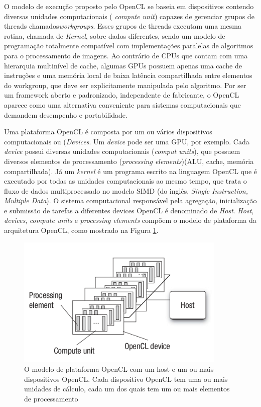 O modelo de execução proposto pelo OpenCL se baseia em dispositivos contendo diversas unidades computacionais ( \textit{compute unit}) capazes de gerenciar grupos de threads chamados\textit{workgroups}. Esses grupos de threads executam uma mesma rotina, chamada de \textit{Kernel}, sobre dados diferentes, sendo um modelo de programação totalmente compatível com implementações paralelas de algoritmos para o processamento de imagens. Ao contrário de CPUs que contam com uma hierarquia multinível de cache, algumas GPUs possuem apenas uma cache de instruções e uma memória local de baixa latência compartilhada entre elementos do workgroup, que deve ser explicitamente manipulada pelo algoritmo. Por ser um framework aberto e padronizado, independente de fabricante, o OpenCL aparece como uma alternativa conveniente para sistemas computacionais que demandem desempenho e portabilidade. 

Uma plataforma OpenCL é composta por um ou vários dispositivos computacionais ou (\textit{Devices}. Um \textit{device} pode ser uma GPU, por exemplo. Cada \textit{device} possui diversas unidades computacionais (\textit{comput units}), que possuem diversos elementos de processamento (\textit{processing elements})(ALU, cache, memória compartilhada). Já um \textit{kernel} é um programa escrito na linguagem OpenCL que é executado por todas as unidades computacionais ao mesmo tempo, que trata o fluxo de dados multiprocessado no modelo SIMD (do inglês, \textit{Single Instruction, Multiple Data}). O sistema computacional responsável pela agregação, inicialização e submissão de tarefas a diferentes devices OpenCL é denominado de \textit{Host}. \textit{Host}, \textit{devices}, \textit{compute units} e \textit{processing elements} compõem o modelo de plataforma da arquitetura OpenCL, como mostrado na Figura \ref{fig:opencl}.
\FloatBarrier
\begin{figure}[!ht]
\centering
\includegraphics[width=10cm]{opencl.png}
\caption{O modelo de plataforma OpenCL com um host e um ou mais dispositivos OpenCL. Cada dispositivo OpenCL tem uma ou mais unidades de cálculo, cada um dos quais tem um ou mais elementos de processamento \cite{munshi2011opencl}}
\label{fig:opencl}
\end{figure}
